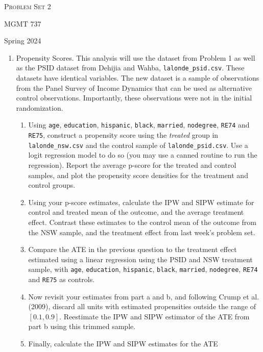 \documentclass[11pt, a4paper]{article}
\begin{document}
\begin{center}
  {\Large \textsc{Problem Set 2}}

  MGMT 737
\end{center}
\begin{center}
  Spring 2024
\end{center}

\begin{enumerate}
\item Propensity Scores. This analysis will use the dataset
  from Problem 1 as well as the PSID dataset from Dehijia and
  Wahba, \texttt{lalonde\_psid.csv}. These datasets have identical
  variables. The new dataset is a sample of observations from the
  Panel Survey of Income Dynamics that can be used as alternative
  control observations. Importantly, these observations were not in
  the initial randomization.
  \begin{enumerate}
  \item Using \texttt{age}, \texttt{education}, \texttt{hispanic},
    \texttt{black}, \texttt{married}, \texttt{nodegree}, \texttt{RE74}
    and \texttt{RE75}, construct a propensity score using the
    \emph{treated} group in \texttt{lalonde\_nsw.csv} and the control
    sample of \texttt{lalonde\_psid.csv}.  Use a logit regression
    model to do so (you may use a canned routine to run the
    regression). Report the average p-score for the treated and
    control samples, and plot the propensity score densities for the
    treatment and control groups.
  \item Using your p-score estimates, calculate the IPW and SIPW
    estimate for control and treated mean of the outcome, and the
    average treatment effect. Contrast these estimates to the control
    mean of the outcome from the NSW sample, and the treatment effect
    from last week's problem set.
  \item Compare the ATE in the previous question to the treatment
    effect estimated using a linear regression using the PSID and NSW
    treatment sample, with \texttt{age}, \texttt{education},
    \texttt{hispanic}, \texttt{black}, \texttt{married},
    \texttt{nodegree}, \texttt{RE74} and \texttt{RE75} as controls.
  \item Now revisit your estimates from part a and b, and following
    Crump et al. (2009), discard all units with estimated propensities
    outside the range of $[0.1, 0.9]$. Reestimate the IPW and SIPW
    estimator of the ATE from part b using this trimmed sample.
  \item Finally, calculate the IPW and SIPW estimates for the ATE

\end{enumerate}
\end{enumerate}
\end{document}
